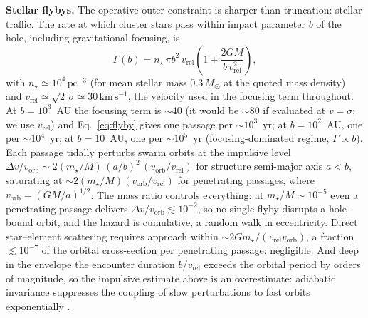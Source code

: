 \documentclass[11pt]{article}
\newcommand{\msun}{\ensuremath{M_\odot}}
\begin{document}
\textbf{Stellar flybys.} The operative outer constraint is sharper than truncation: stellar traffic. The rate at which cluster stars pass within impact parameter $b$ of the hole, including gravitational focusing, is
\begin{equation}
\Gamma(b) = n_{\star}\,\pi b^{2}\,v_{\mathrm{rel}}
\left(1 + \frac{2GM}{b\,v_{\mathrm{rel}}^{2}}\right),
\label{eq:flyby}
\end{equation}
with $n_{\star} \simeq 10^{4}\,\mathrm{pc^{-3}}$ (for mean stellar mass $0.3\,\msun$ at the quoted mass density) and $v_{\mathrm{rel}} \simeq \sqrt{2}\,\sigma \simeq 30\,\mathrm{km\,s^{-1}}$, the velocity used in the focusing term throughout. At $b = 10^{3}$~AU the focusing term is $\sim 40$ (it would be $\sim 80$ if evaluated at $v = \sigma$; we use $v_{\mathrm{rel}}$) and Eq.~\ref{eq:flyby} gives one passage per $\sim 10^{3}$~yr; at $b = 10^{2}$~AU, one per $\sim 10^{4}$~yr; at $b = 10$~AU, one per $\sim 10^{5}$~yr (focusing-dominated regime, $\Gamma \propto b$). Each passage tidally perturbs swarm orbits at the impulsive level $\Delta v / v_{\mathrm{orb}} \sim 2(m_{\star}/M)\,(a/b)^{2}\,(v_{\mathrm{orb}}/v_{\mathrm{rel}})$ for structure semi-major axis $a < b$, saturating at $\sim 2(m_{\star}/M)(v_{\mathrm{orb}}/v_{\mathrm{rel}})$ for penetrating passages, where $v_{\mathrm{orb}} = (GM/a)^{1/2}$. The mass ratio controls everything: at $m_{\star}/M \sim 10^{-5}$ even a penetrating passage delivers $\Delta v/v_{\mathrm{orb}} \lesssim 10^{-2}$, so no single flyby disrupts a hole-bound orbit, and the hazard is cumulative, a random walk in eccentricity. Direct star--element scattering requires approach within $\sim 2Gm_{\star}/(v_{\mathrm{rel}}v_{\mathrm{orb}})$, a fraction $\lesssim 10^{-7}$ of the orbital cross-section per penetrating passage: negligible. And deep in the envelope the encounter duration $b/v_{\mathrm{rel}}$ exceeds the orbital period by orders of magnitude, so the impulsive estimate above is an overestimate: adiabatic invariance suppresses the coupling of slow perturbations to fast orbits exponentially \citep{BinneyTremaine2008,HeggieHut2003}.
\end{document}
